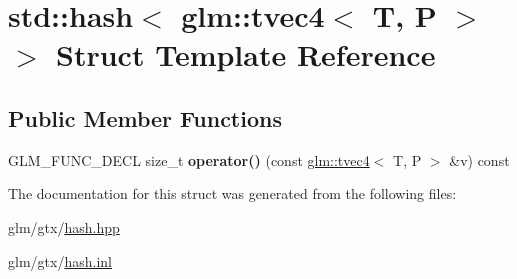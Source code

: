 \hypertarget{structstd_1_1hash_3_01glm_1_1tvec4_3_01T_00_01P_01_4_01_4}{\section{std\-:\-:hash$<$ glm\-:\-:tvec4$<$ T, P $>$ $>$ Struct Template Reference}
\label{structstd_1_1hash_3_01glm_1_1tvec4_3_01T_00_01P_01_4_01_4}
}
\subsection*{Public Member Functions}
\begin{DoxyCompactItemize}
\item 
\hypertarget{structstd_1_1hash_3_01glm_1_1tvec4_3_01T_00_01P_01_4_01_4_a12a43a9fa6cafaadd94ebb207e913b11}{G\-L\-M\-\_\-\-F\-U\-N\-C\-\_\-\-D\-E\-C\-L size\-\_\-t {\bfseries operator()} (const \hyperlink{structglm_1_1tvec4}{glm\-::tvec4}$<$ T, P $>$ \&v) const }\label{structstd_1_1hash_3_01glm_1_1tvec4_3_01T_00_01P_01_4_01_4_a12a43a9fa6cafaadd94ebb207e913b11}

\end{DoxyCompactItemize}


The documentation for this struct was generated from the following files\-:\begin{DoxyCompactItemize}
\item 
glm/gtx/\hyperlink{hash_8hpp}{hash.\-hpp}\item 
glm/gtx/\hyperlink{hash_8inl}{hash.\-inl}\end{DoxyCompactItemize}
